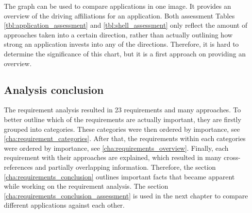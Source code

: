 The graph can be used to compare applications in one image.
It provides an overview of the driving affiliations for an application.
Both assessment Tables \ref{tbl:application_assessment} and \ref{tbl:shell_assessment} only reflect the amount of approaches taken into a certain direction, rather than actually outlining how strong an application invests into any of the directions.
Therefore, it is hard to determine the significance of this chart, but it is a first approach on providing an overview.





\subsection{Analysis conclusion}

The requirement analysis resulted in 23 requirements and many approaches.
To better outline which of the requirements are actually important, they are firstly grouped into categories.
These categories were then ordered by importance, see \ref{cha:requirement_categories}.
After that, the requirements within each categories were ordered by importance, see \ref{cha:requirements_overview}.
Finally, each requirement with their approaches are explained, which resulted in many cross-references and partially overlapping information.
Therefore, the section \ref{cha:requirements_conclusion} outlines important facts that became apparent while working on the requirement analysis.
The section \ref{cha:requirements_conclusion_assessment} is used in the next chapter to compare different applications against each other.
